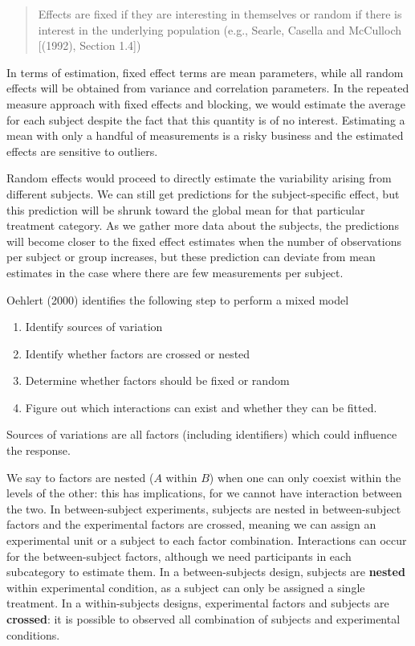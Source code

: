 \documentclass[
  11pt,
  letterpaper,
]{scrbook}
\providecommand{\tightlist}{%
  \setlength{\itemsep}{0pt}\setlength{\parskip}{0pt}}\usepackage{longtable,booktabs,array}
\theoremstyle{definition}
\theoremstyle{definition}
\theoremstyle{remark}
\begin{document}
\begin{quote}
Effects are fixed if they are interesting in themselves or random if
there is interest in the underlying population (e.g., Searle, Casella
and McCulloch {[}(1992), Section 1.4{]})
\end{quote}

In terms of estimation, fixed effect terms are mean parameters, while
all random effects will be obtained from variance and correlation
parameters. In the repeated measure approach with fixed effects and
blocking, we would estimate the average for each subject despite the
fact that this quantity is of no interest. Estimating a mean with only a
handful of measurements is a risky business and the estimated effects
are sensitive to outliers.

Random effects would proceed to directly estimate the variability
arising from different subjects. We can still get predictions for the
subject-specific effect, but this prediction will be shrunk toward the
global mean for that particular treatment category. As we gather more
data about the subjects, the predictions will become closer to the fixed
effect estimates when the number of observations per subject or group
increases, but these prediction can deviate from mean estimates in the
case where there are few measurements per subject.

Oehlert (2000) identifies the following step to perform a mixed model

\begin{enumerate}
\def\labelenumi{\arabic{enumi}.}
\tightlist
\item
  Identify sources of variation
\item
  Identify whether factors are crossed or nested
\item
  Determine whether factors should be fixed or random
\item
  Figure out which interactions can exist and whether they can be
  fitted.
\end{enumerate}

Sources of variations are all factors (including identifiers) which
could influence the response.

We say to factors are nested (\(A\) within \(B\)) when one can only
coexist within the levels of the other: this has implications, for we
cannot have interaction between the two. In between-subject experiments,
subjects are nested in between-subject factors and the experimental
factors are crossed, meaning we can assign an experimental unit or a
subject to each factor combination. Interactions can occur for the
between-subject factors, although we need participants in each
subcategory to estimate them. In a between-subjects design, subjects are
\textbf{nested} within experimental condition, as a subject can only be
assigned a single treatment. In a within-subjects designs, experimental
factors and subjects are \textbf{crossed}: it is possible to observed
all combination of subjects and experimental conditions.
\end{document}
